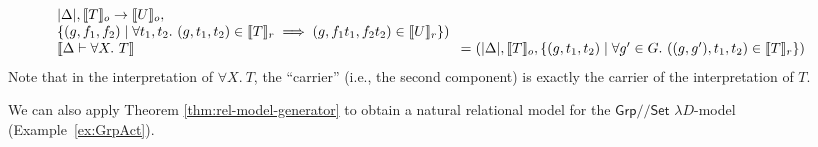 \documentclass[a4paper,UKenglish]{lipics}
\theoremstyle{plain}
\newcommand{\msf}[1]{\mathsf{#1}} %
\newcommand{\Grp}{\msf{Grp}}
\newcommand{\Set}{\msf{Set}}
\newcommand{\Lslice}[1]{#1/\!/\Set}
\newcommand{\GrpSet}{\Lslice{\Grp}}
\newcommand{\sem}[1]{\ensuremath{\llbracket #1 \rrbracket}}
\newcommand{\semo}[1]{\ensuremath{\llbracket #1 \rrbracket _o}}
\newcommand{\semr}[1]{\ensuremath{\llbracket #1 \rrbracket _r}}
\begin{document}
\begin{example}
\begin{displaymath}
\begin{array}{@{}l@{\hspace{0.3em}}c@{\hspace{0.3em}}l}
\begin{array}[t]{@{}l}
        |\Delta|,\semo{T} \to \semo{U}, \\
        \{ (g, f_1, f_2) \mathrel| \forall t_1, t_2.~(g,t_1,t_2) \in \semr{T} \implies (g,f_1t_1, f_2t_2) \in \semr{U} \})
      \end{array}
      \\
      \sem{\Delta \vdash \forall X.~T} & = &
      (\begin{array}[t]{@{}l}
        |\Delta|,\semo{T},
        \{ (g, t_1, t_2) \mathrel| \forall g' \in G.~((g,g'), t_1, t_2) \in \semr{T} \} )
      \end{array}
    \end{array}
  \end{displaymath}
Note that in the interpretation of $\forall X.~T$, the ``carrier'' (i.e., the second component) is exactly the carrier of the interpretation of $T$.
\end{example}

We can also apply Theorem \ref{thm:rel-model-generator} to obtain a natural relational model for the $\GrpSet$ $\lambda D$-model (Example~\ref{ex:GrpAct}).
\end{document}
